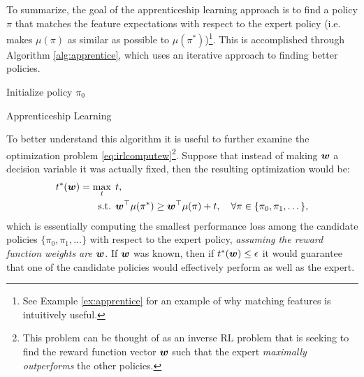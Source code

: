 To summarize, the goal of the apprenticeship learning approach is to find a policy $\pi$ that matches the feature expectations with respect to the expert policy (i.e. makes $\mu(\pi)$ as similar as possible to $\mu(\pi^*)$)\footnote{See Example \ref{ex:apprentice} for an example of why matching features is intuitively useful.}. This is accomplished through Algorithm \ref{alg:apprentice}, which uses an iterative approach to finding better policies.
\begin{algorithm}[ht]
 \KwData{$\mu(\pi^*)$, $\epsilon$}
 \KwResult{$\hat{\pi}^*$}
 Initialize policy $\pi_0$\\
 \caption{Apprenticeship Learning}
 \label{alg:apprentice}
\end{algorithm}

To better understand this algorithm it is useful to further examine the optimization problem \eqref{eq:irlcomputew}\footnote{This problem can be thought of as an inverse RL problem that is seeking to find the reward function vector $\bm{w}$ such that the expert \textit{maximally outperforms} the other policies.}. Suppose that instead of making $\bm{w}$ a decision variable it was actually fixed, then the resulting optimization would be:
\begin{equation*}
\begin{split}
t^*(\bm{w}) = \underset{t}{\max} \:\: & t,\\
\text{s.t.} \:\:& \bm{w}^\top \mu(\pi^*) \geq \bm{w}^\top \mu(\pi) + t, \quad \forall \pi \in  \{\pi_0, \pi_1, \dots\},\\
\end{split}
\end{equation*}
which is essentially computing the smallest performance loss among the candidate policies $\{\pi_0, \pi_1, \dots\}$ with respect to the expert policy, \textit{assuming the reward function weights are $\bm{w}$}. If $\bm{w}$ was known, then if $t^*(\bm{w}) \leq \epsilon$ it would guarantee that one of the candidate policies would effectively perform as well as the expert. 

